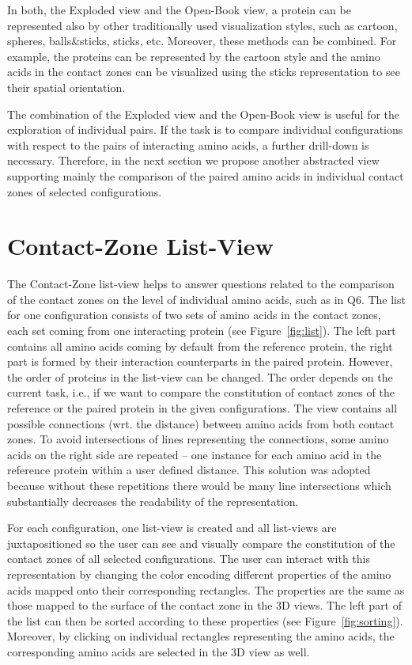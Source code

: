 \documentclass{bmcart}
\def\OpBook {Open-Book view\xspace}
\def\ExpView {Exploded view\xspace}
\def\CoZoListView {Contact-Zone list-view\xspace}
\begin{document}
In both, the \ExpView and the \OpBook, a protein can be represented also by other traditionally used visualization styles, such as cartoon, spheres, balls\&sticks, sticks, etc.
Moreover, these methods can be combined. 
For example, the proteins can be represented by the cartoon style and the amino acids in the contact zones can be visualized using the sticks representation to see their spatial orientation.%

The combination of the \ExpView and the \OpBook is useful for the exploration of individual pairs.
If the task is to compare individual configurations with respect to the pairs of interacting amino acids, a further drill-down is necessary.
Therefore, in the next section we propose another abstracted view supporting mainly the comparison of the paired amino acids in individual contact zones of selected configurations.


\section{Contact-Zone List-View}
The \CoZoListView helps to answer questions related to the comparison of the contact zones on the level of individual amino acids, such as in Q6.
The list for one configuration consists of two sets of amino acids in the contact zones, each set coming from one interacting protein (see Figure~\ref{fig:list}).
The left part contains all amino acids coming by default from the reference protein, the right part is formed by their interaction counterparts in the paired protein.
However, the order of proteins in the list-view can be changed.
The order depends on the current task, i.e., if we want to compare the constitution of contact zones of the reference or the paired protein in the given configurations.
The view contains all possible connections (wrt. the distance) between amino acids from both contact zones.
To avoid intersections of lines representing the connections, some amino acids on the right side are repeated -- one instance for each amino acid in the reference protein within a user defined distance. 
This solution was adopted because without these repetitions there would be many line intersections which substantially decreases the readability of the representation.

For each configuration, one list-view is created and all list-views are juxtapositioned so the user can see and visually compare the constitution of the contact zones of all selected configurations.
The user can interact with this representation by changing the color encoding different properties of the amino acids mapped onto their corresponding rectangles.
The properties are the same as those mapped to the surface of the contact zone in the 3D views.
The left part of the list can then be sorted according to these properties (see Figure~\ref{fig:sorting}).
Moreover, by clicking on individual rectangles representing the amino acids, the corresponding amino acids are selected in the 3D view as well.
\end{document}
